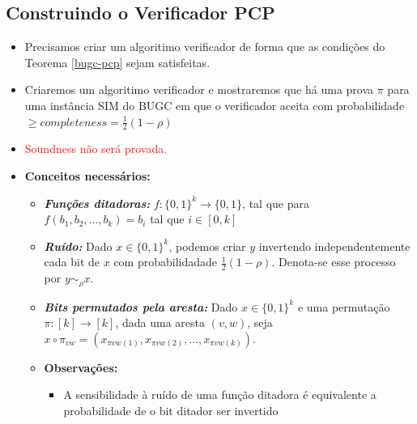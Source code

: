 \documentclass[12pt,a4paper]{article}
\begin{document}
\subsection{Construindo o Verificador PCP}
\begin{itemize}
    \item Precisamos criar um algoritimo verificador de forma que as condições do Teorema \ref{bugc-pcp} sejam satisfeitas.
    \item Criaremos um algoritimo verificador e mostraremos que há uma prova $\pi$ para uma instância SIM do BUGC em que o verificador aceita com probabilidade $\geq completeness = \frac{1}{2}(1-\rho)$
    \item \textcolor{red}{Soundness não será provada.}
    \item \textbf{Conceitos necessários:}
    \begin{itemize}
        \item \textit{\textbf{Funções ditadoras:}} $f:\{0,1\}^k \xrightarrow\ \{0,1\}$, tal que para $f(b_1,b_2,...,b_k)=b_i$ tal que $i\in [0,k]$
        \item \textit{\textbf{Ruído:}} Dado $x\in \{0,1\}^k$, podemos criar $y$ invertendo independentemente cada bit de $x$ com probabilidadade $\frac{1}{2} (1-\rho)$. Denota-se esse processo por $y\sim_\rho x$.
        \item \textit{\textbf{Bits permutados pela aresta:}}  Dado $x\in \{0,1\}^k$ e uma permutação $\pi:[k]\xrightarrow\ [k]$, dada uma aresta $(v,w)$, seja $x \circ \pi_{vw} = (x_{\pi vw(1)},x_{\pi vw(2)},...,x_{\pi vw(k)})$.
        \item \textbf{Observações:}
            \begin{itemize}
                \item A sensibilidade à ruído de uma função ditadora é equivalente a probabilidade de o bit ditador ser invertido
            \end{itemize}
    \end{itemize}
    

\end{itemize}
\end{document}
